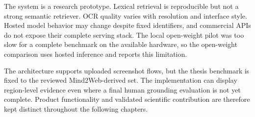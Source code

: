 The system is a research prototype. Lexical retrieval is reproducible but not a
strong semantic retriever. OCR quality varies with resolution and interface
style. Hosted model behavior may change despite fixed identifiers, and
commercial APIs do not expose their complete serving stack. The local
open-weight pilot was too slow for a complete benchmark on the available
hardware, so the open-weight comparison uses hosted inference and reports this
limitation.

The architecture supports uploaded screenshot flows, but the thesis benchmark
is fixed to the reviewed Mind2Web-derived set. The implementation can display
region-level evidence even where a final human grounding evaluation is not yet
complete. Product functionality and validated scientific contribution are
therefore kept distinct throughout the following chapters.
